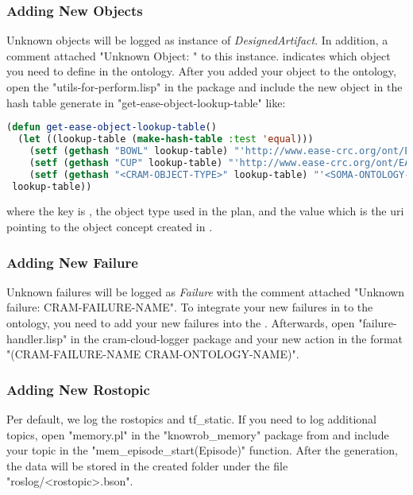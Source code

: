 \subsubsection{Adding New Objects}
Unknown objects will be logged as instance of \textit{DesignedArtifact}.
In addition, a comment attached "Unknown Object: " to this instance.
 indicates which object you need to define in the ontology.
After you added your object to the ontology, open the "utils-for-perform.lisp" in the \cramloggerpackage package and include the new object in the hash table generate in "get-ease-object-lookup-table" like:

\begin{lstlisting}[language=lisp, caption=Linking the CRAM Object to the Ontology Concept]
(defun get-ease-object-lookup-table()
  (let ((lookup-table (make-hash-table :test 'equal)))
    (setf (gethash "BOWL" lookup-table) "'http://www.ease-crc.org/ont/EASE-OBJ.owl#Bowl'")
    (setf (gethash "CUP" lookup-table) "'http://www.ease-crc.org/ont/EASE-OBJ.owl#Cup'")
    (setf (gethash "<CRAM-OBJECT-TYPE>" lookup-table) "'<SOMA-ONTOLOGY-ENTITY-URL>'")
 lookup-table))
\end{lstlisting}

where the key is , the object type used in the \cram plan, and the value which is the uri pointing to the object concept created in \soma.

\subsubsection{Adding New Failure}
Unknown failures will be logged as \textit{Failure} with the comment attached "Unknown failure: CRAM-FAILURE-NAME".
To integrate your new \cram failures in to the ontology, you need to add your new failures into the \cramOwl.
Afterwards, open "failure-handler.lisp" in the cram-cloud-logger package and your new action in the format "(CRAM-FAILURE-NAME CRAM-ONTOLOGY-NAME)".	

\subsubsection{Adding New Rostopic}
Per default, we log the rostopics \tf and tf\_static.
If you need to log additional topics, open "memory.pl" in the "knowrob\_memory" package from \knowrob and include your topic in the "mem\_episode\_start(Episode)" function.
After the \neem generation, the data will be stored in the created \neem folder under the file "roslog/<rostopic>.bson".

